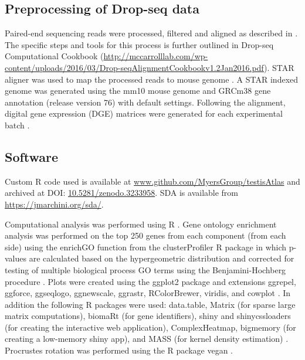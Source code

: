 \subsection{Preprocessing of Drop-seq data}

Paired-end sequencing reads were processed, filtered and aligned as described in \cite{Macosko2015Highly}. The specific steps and tools for this process is further outlined in Drop-seq Computational Cookbook (\url{http://mccarrolllab.com/wp-content/uploads/2016/03/Drop-seqAlignmentCookbookv1.2Jan2016.pdf}). STAR aligner was used to map the processed reads to mouse genome \parencite{Dobin2013STAR}. A STAR indexed genome was generated using the mm10 mouse genome and GRCm38 gene annotation (release version 76) with default settings. Following the alignment, digital gene expression (DGE) matrices were generated for each experimental batch \parencite{Macosko2015Highly}.

\subsection{Software}
Custom R code used is available at \url{www.github.com/MyersGroup/testisAtlas} and archived at DOI: \href{http://www.doi.org/10.5281/zenodo.3233958}{10.5281/zenodo.3233958}. SDA is available from \url{https://jmarchini.org/sda/}.

Computational analysis was performed using R \parencite{RCoreTeam2018Language}. Gene ontology enrichment analysis was performed on the top 250 genes from each component (from each side) using the enrichGO function from the clusterProfiler R package in which p-values are calculated based on the hypergeometric distribution and corrected for testing of multiple biological process GO terms using the Benjamini-Hochberg procedure \parencite{Yu2012clusterProfiler}. Plots were created using the ggplot2 package and extensions ggrepel, ggforce, ggseqlogo, ggnewscale, ggrastr, RColorBrewer, viridis, and cowplot \parencite{Campitelli2019ggnewscale, Garnier2018viridis, Neuwirth2014RColorBrewer, Pedersen2016ggforce, Petukhov2018ggrastr, Wagih2017ggseqlogo, Wickham2016ggplot2, Wilke2018cowplot}. In addition the following R packages were used: data.table, Matrix (for sparse large matrix computations), biomaRt (for gene identifiers), shiny and shinycssloaders (for creating the interactive web application), ComplexHeatmap, bigmemory (for creating a low-memory shiny app), and MASS (for kernel density estimation) \parencite{Bates2018Matrix, Chang2018shiny, Dowle2019data, Durinck2005BioMart, Gu2016Complex, Kane2013Scalable, Sali2017shinycssloaders, Venables2002Modern}. Procrustes rotation was performed using the R package vegan \parencite{Lin2019NNLM, Oksanen2019vegan}.

